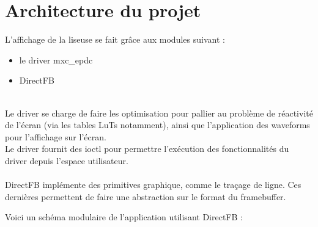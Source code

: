\chapter{Architecture du projet}


L'affichage de la liseuse se fait grâce aux modules suivant : 
\begin{itemize}
	\item le driver mxc_epdc
	\item DirectFB
\end{itemize}~\\

Le driver se charge de faire les optimisation pour pallier au problème de réactivité de l'écran (via les tables LuTs notamment), ainsi que l'application des waveforms pour l'affichage sur l'écran.\\
Le driver fournit des ioctl pour permettre l'exécution des fonctionnalités du driver depuis l'espace utilisateur.~\\~\\
DirectFB implémente des primitives graphique, comme le traçage de ligne. Ces dernières permettent de faire une abstraction sur le format du framebuffer.

Voici un schéma modulaire de l'application utilisant DirectFB : 

